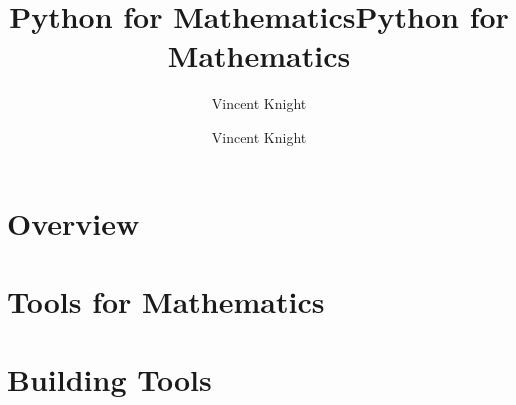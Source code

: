 \documentclass[Alon2,singlecolor,10pt]{Alon}%
\title{Python for Mathematics}
\author{Vincent Knight}
\begin{document}
\frontmatter




\title{Python for Mathematics} %

\author{Vincent Knight}%


\maketitle


\cleardoublepage
\setcounter{page}{7} %
\tableofcontents



\mainmatter


\part{Overview}


\part{Tools for Mathematics}











\part{Building Tools}













\printindex
\cleardoublepage
\end{document}
